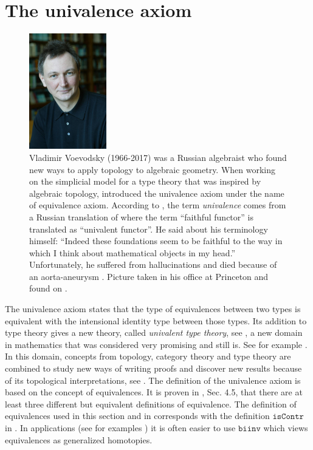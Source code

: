 \documentclass[12pt,a4paper,twoside,xetex]{book} %
\newcommand{\keyword}[1]{\emph{#1}\index{#1}}
\newcommand{\op}[1]{\mathtt{#1}}
\begin{document}
\section{The univalence axiom}

\begin{figure}
\begin{center}
\includegraphics[width=0.3\textwidth]{figures/Voevodsky}
\par\end{center}
\caption{\label{fig:Vladimir-Voevodsky-1966-2017}
  Vladimir Voevodsky (1966-2017)  was a Russian
algebraist who found new ways to apply topology to algebraic geometry. When 
working on the simplicial model for a type theory that was inspired by 
algebraic topology, \cite{Voevodsky2010a} introduced the univalence axiom under 
the name of equivalence axiom. According to \cite{Voevodsky2014}, the term \keyword{univalence} comes from a 
Russian translation of \cite{Boardman2006} where  the term
\textquotedblleft faithful functor\textquotedblright{} is translated
as \textquotedblleft univalent functor\textquotedblright . He said about his terminology himself: ``Indeed these foundations seem 
to be faithful to the way in which I think about mathematical objects in my 
head.''
 Unfortunately, he suffered from hallucinations \cite{Baez2017} and died 
because of an aorta-aneurysm \cite{Rehmeyer2017}. Picture taken in his office at Princeton and found on \cite{Grayson2017}.}
\end{figure}

The univalence axiom states that the type of equivalences between two types is 
equivalent with the intensional identity type between those types. Its addition 
to type theory gives a new theory, called \keyword{univalent type theory}, see 
, a new domain in mathematics that was considered very 
promising and still is. See for example \cite{shulman_2018}. In this domain, concepts from topology, category theory 
and type theory  are combined to study new ways of writing proofs and discover 
new results because of its topological interpretations, see 
. The definition of the univalence axiom is based on the 
concept of equivalences. It is proven in \cite{Voevodsky2013}, Sec. 4.5, 
that there are at least three different but equivalent definitions of 
equivalence. The definition of equivalences used in this section and in 
\cite{Pelayo2014} corresponds with the definition $\op{isContr}$ in 
\cite{Voevodsky2013}. In applications (see for examples ) it 
is often easier to use $\op{biinv}$ which views equivalences as
generalized homotopies.
\end{document}
